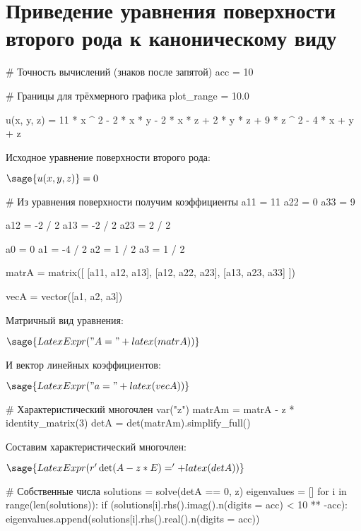 \section{Приведение уравнения поверхности второго рода к каноническому виду}

\begin{sagesilent}
    # Точность вычислений (знаков после запятой)
    acc = 10

    # Границы для трёхмерного графика
    plot_range = 10.0

    u(x, y, z) = 11 * x ^ 2 - 2 * x * y - 2 * x * z + 2 * y * z + 9 * z ^ 2 - 4 * x + y + z
\end{sagesilent}

Исходное уравнение поверхности второго рода:

$\sage{u(x, y, z)} = 0$

\begin{sagesilent}
    # Из уравнения поверхности получим коэффициенты
    a11 = 11
    a22 = 0
    a33 = 9

    a12 = -2 / 2
    a13 = -2 / 2
    a23 = 2 / 2

    a0 = 0
    a1 = -4 / 2
    a2 = 1 / 2
    a3 = 1 / 2

    matrA = matrix([
    [a11, a12, a13],
    [a12, a22, a23],
    [a13, a23, a33]
    ])

    vecA = vector([a1, a2, a3])
\end{sagesilent}

Матричный вид уравнения:

$\sage{LatexExpr("A = " + latex(matrA))}$

И вектор линейных коэффициентов:

$\sage{LatexExpr("a = " + latex(vecA))}$

\begin{sagesilent}
    # Характеристический многочлен
    var("z")
    matrAm = matrA - z * identity_matrix(3)
    detA = det(matrAm).simplify_full()
\end{sagesilent}

Составим характеристический многочлен:

$\sage{LatexExpr(r'\det(A - z * E) = ' + latex(detA))}$

\begin{sagesilent}
    # Собственные числа
    solutions = solve(detA == 0, z)
    eigenvalues = []
    for i in range(len(solutions)):
        if (solutions[i].rhs().imag().n(digits = acc) < 10 ** -acc):
            eigenvalues.append(solutions[i].rhs().real().n(digits = acc))
\end{sagesilent}

